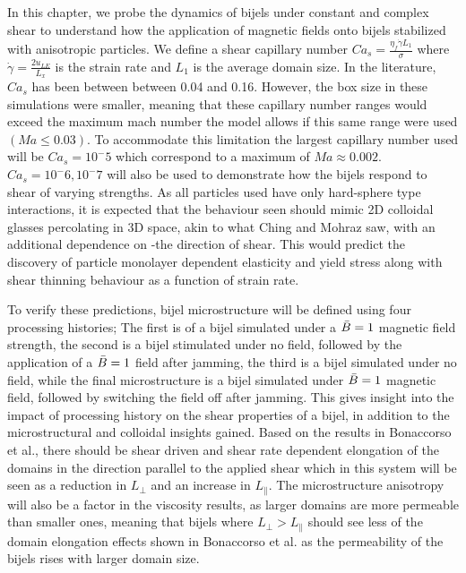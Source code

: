 In this chapter, we probe the dynamics of bijels under constant and complex shear to understand how the application of magnetic fields onto bijels stabilized with
anisotropic particles. We define a shear capillary number $Ca_s = \frac{\eta_{f} \dot{\gamma} L_{1}}{\sigma}$ where $\dot{\gamma} = \frac{2u_{LE}}{L_x}$ is the
strain rate and $L_1$ is the average domain size. \cite{frijters_effects_2012, yang_capillary_2022} In the literature, $Ca_s$ has been between between 0.04 
and 0.16. However, the box size in these simulations were smaller, meaning that these capillary number ranges would exceed the 
maximum mach number the model allows if this same range were used $(Ma \leq 0.03)$. To accommodate this limitation the 
largest capillary number used will be $Ca_s = 10^-5$ which correspond to a maximum of $Ma \approx 0.002$. $Ca_s = 10^-6,  
10^-7$ will also be used to demonstrate how the bijels respond to shear of varying strengths. As all particles used 
have only hard-sphere type interactions, it is expected that the behaviour seen should mimic 2D colloidal glasses 
percolating in 3D space, akin to what Ching and Mohraz saw, with an additional dependence on -the direction of shear. 
This would predict the discovery of particle monolayer dependent elasticity and yield stress along with shear thinning 
behaviour as a function of strain rate. 

To verify these predictions, bijel microstructure will be defined using four processing histories; The first is of a 
bijel simulated under a $\Bar{B} = 1$ magnetic field strength, the second is a bijel stimulated under no field, 
followed by the application of a $\Bar{B} = 1$ field after jamming, the third is a bijel simulated under no field, 
while the final microstructure is a bijel simulated under $\Bar{B} = 1$ magnetic field, followed by switching the 
field off after jamming. This gives insight into the impact of processing history on the shear properties of a bijel, 
in addition to the microstructural and colloidal insights gained. Based on the results in Bonaccorso et al., there 
should be shear driven and shear rate dependent elongation of the domains in the direction parallel to the applied 
shear which in this system will be seen as a reduction in $L_{\perp}$ and an increase in $L_{\parallel}$. 
\cite{bonaccorso_shear_2020} The microstructure anisotropy will also be a factor in the viscosity results, as 
larger domains are more permeable than smaller ones, meaning that bijels where $L_{\perp} > L_{\parallel}$ should 
see less of the domain elongation effects shown in Bonaccorso et al. as the permeability of the bijels rises with 
larger domain size. \cite{bonaccorso_shear_2020}

